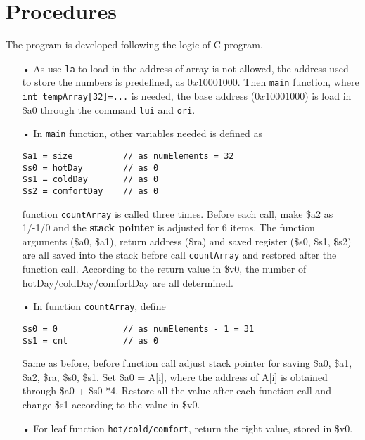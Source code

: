 \documentclass[a4paper]{article}
\begin{document}
	\section{Procedures}
The program is developed following the logic of C program. 
\begin{enumerate}
\item[•] As use \texttt{la} to load in the address of array is not allowed, the address used to store the numbers is predefined, as $0x10001000$. Then \texttt{main} function, where \texttt{int tempArray[32]=...} is needed, the base address ($0x10001000$) is load in \$a0 through the command \texttt{lui} and \texttt{ori}.
\item[•] In \texttt{main} function, other variables needed is defined as 



\begin{verbatim}
$a1 = size			// as numElements = 32 
$s0 = hotDay 		// as 0
$s1 = coldDay 		// as 0
$s2 = comfortDay 	// as 0
 \end{verbatim}
function \texttt{countArray} is called three times. Before each call, make 
\$a2 as 1/-1/0 and the \textbf{stack pointer} is adjusted for 6 items. The function arguments (\$a0, \$a1), return address (\$ra) and saved register (\$s0, \$s1, \$s2) are all saved into the stack before call \texttt{countArray} and restored after the function call. According to the return value in \$v0, the number of hotDay/coldDay/comfortDay are all determined.
\item[•] In function \texttt{countArray}, define 
\begin{verbatim}
$s0 = 0				// as numElements - 1 = 31 
$s1 = cnt 			// as 0
 \end{verbatim}
 Same as before, before function call adjust stack pointer for saving \$a0, \$a1, \$a2, \$ra, \$s0, \$s1. Set \$a0 = A[i], where the address of A[i] is obtained through \$a0 + \$s0 *4. 
 Restore all the value after each function call and change \$s1 according to the value in \$v0.
 \item[•] For leaf function \texttt{hot/cold/comfort}, return the right value, stored in \$v0. 
\end{enumerate}	
	
		
\end{document}
